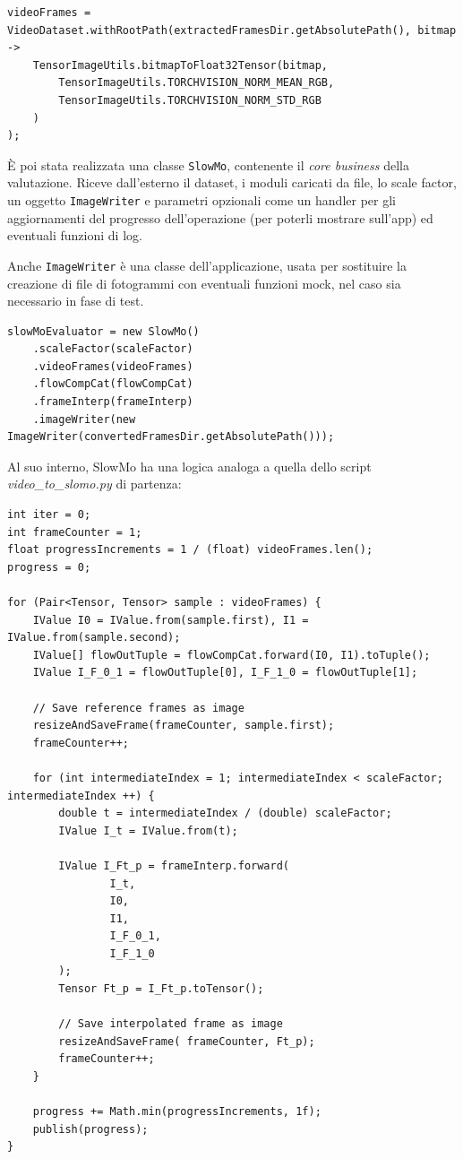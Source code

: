 \begin{lstlisting}
videoFrames = VideoDataset.withRootPath(extractedFramesDir.getAbsolutePath(), bitmap ->
    TensorImageUtils.bitmapToFloat32Tensor(bitmap,
        TensorImageUtils.TORCHVISION_NORM_MEAN_RGB,
        TensorImageUtils.TORCHVISION_NORM_STD_RGB
    )
);
\end{lstlisting}

È poi stata realizzata una classe \texttt{SlowMo}, contenente il \emph{core business} della
valutazione. Riceve dall'esterno il dataset, i moduli caricati da file, lo scale factor, 
un oggetto \texttt{ImageWriter} e parametri opzionali come un handler per gli aggiornamenti 
del progresso dell'operazione (per poterli mostrare sull'app) ed eventuali funzioni di log.

Anche \texttt{ImageWriter} è una classe dell'applicazione, usata per sostituire la creazione di
file di fotogrammi con eventuali funzioni mock, nel caso sia necessario in fase di test.

\begin{lstlisting}
slowMoEvaluator = new SlowMo()
    .scaleFactor(scaleFactor)
    .videoFrames(videoFrames)
    .flowCompCat(flowCompCat)
    .frameInterp(frameInterp)
    .imageWriter(new ImageWriter(convertedFramesDir.getAbsolutePath()));
\end{lstlisting}

Al suo interno, SlowMo ha una logica analoga a quella dello script \emph{video\_to\_slomo.py}
di partenza:

\begin{lstlisting}
int iter = 0;
int frameCounter = 1;
float progressIncrements = 1 / (float) videoFrames.len();
progress = 0;

for (Pair<Tensor, Tensor> sample : videoFrames) {
    IValue I0 = IValue.from(sample.first), I1 = IValue.from(sample.second);
    IValue[] flowOutTuple = flowCompCat.forward(I0, I1).toTuple();
    IValue I_F_0_1 = flowOutTuple[0], I_F_1_0 = flowOutTuple[1];

    // Save reference frames as image
    resizeAndSaveFrame(frameCounter, sample.first);
    frameCounter++;

    for (int intermediateIndex = 1; intermediateIndex < scaleFactor; intermediateIndex ++) {
        double t = intermediateIndex / (double) scaleFactor;
        IValue I_t = IValue.from(t);

        IValue I_Ft_p = frameInterp.forward(
                I_t,
                I0,
                I1,
                I_F_0_1,
                I_F_1_0
        );
        Tensor Ft_p = I_Ft_p.toTensor();

        // Save interpolated frame as image
        resizeAndSaveFrame( frameCounter, Ft_p);
        frameCounter++;
    }

    progress += Math.min(progressIncrements, 1f);
    publish(progress);
}
\end{lstlisting}

